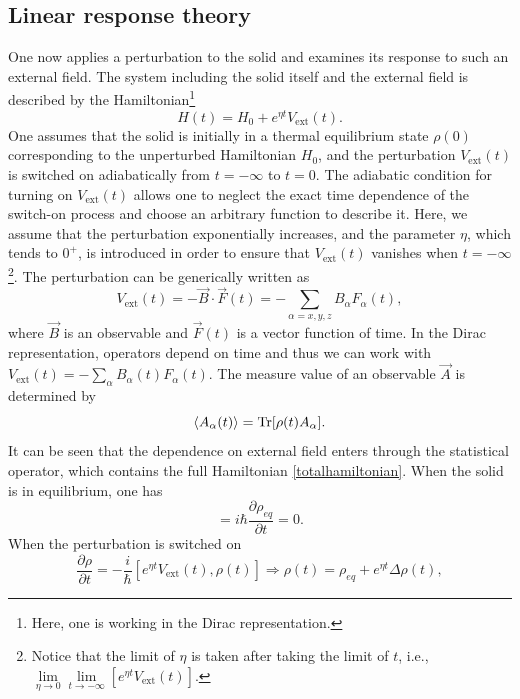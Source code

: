 \documentclass[a4paper,12pts,dvipsnames]{article}
\numberwithin{equation}{section}
\begin{document}
\subsection{Linear response theory}
One now applies a perturbation to the solid and examines its response to such an external field. The system including the solid itself and the external field is described by the Hamiltonian\footnote{Here, one is working in the Dirac representation.}
\begin{equation}
H(t) = H_0 + e^{\eta t}V_{\text{ext}}(t).\label{totalhamiltonian}
\end{equation}
One assumes that the solid is initially in a thermal equilibrium state $\rho(0)$ corresponding to the unperturbed Hamiltonian $H_0$, and the perturbation $V_{\text{ext}}(t)$ is switched on adiabatically from $t=-\infty$ to $t=0$. The adiabatic condition for turning on $V_{\text{ext}}(t)$ allows one to neglect the exact time dependence of the switch-on process and choose an arbitrary function to describe it. Here, we assume that the perturbation exponentially increases, and the parameter $\eta$, which tends to $0^+$, is introduced in order to ensure that $V_{\text{ext}}(t)$ vanishes when $t=-\infty$\footnote{Notice that the limit of $\eta$ is taken after taking the limit of $t$, i.e., $\lim\limits_{\eta\rightarrow0}\lim\limits_{t\rightarrow-\infty}\left[e^{\eta t}V_{\text{ext}}(t)\right]$.}. The perturbation can be generically written as
\begin{equation}\label{interaction}
V_{\text{ext}}(t) = -\vec{B}\cdot\vec{F}(t) = -\sum_{\alpha=x,y,z}B_{\alpha}F_{\alpha}(t),
\end{equation}
where $\vec{B}$ is an observable and $\vec{F}(t)$ is a vector function of time. In the Dirac representation, operators depend on time and thus we can work with $V_{\text{ext}}(t) =-\sum_{\alpha}B_{\alpha}(t)F_{\alpha}(t)$. The measure value of an observable $\vec{A}$ is determined by
\begin{equation}
\braket{A_{\alpha}(t)} = \text{Tr}[\rho(t)A_{\alpha}].
\end{equation}
It can be seen that the dependence on external field enters through the statistical operator, which contains the full Hamiltonian \ref{totalhamiltonian}. When the solid is in equilibrium, one has
\begin{equation}
[0,\rho_{eq}] = i\hbar\frac{\partial\rho_{eq}}{\partial t} = 0.
\end{equation}
When the perturbation is switched on
\begin{equation}
	\frac{\partial\rho}{\partial t} = -\frac{i}{\hbar}[e^{\eta t}V_{\text{ext}}(t),\rho(t)] \Rightarrow \rho(t) = \rho_{eq} + e^{\eta t}\Delta\rho(t),
\end{equation}
\end{document}
